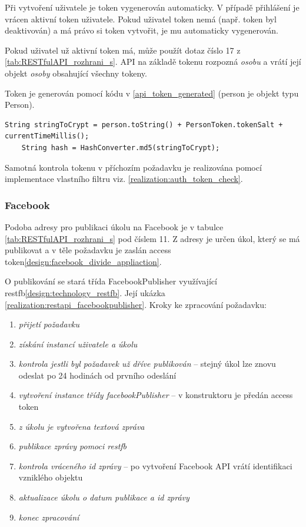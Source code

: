 \documentclass[thesis=B,czech]{FITthesis}[2012/06/26]
\begin{document}
Při vytvoření uživatele je token vygenerován automaticky. V případě přihlášení je vrácen aktivní token uživatele. Pokud uživatel token nemá (např. token byl deaktivován) a má právo si token vytvořit, je mu automaticky vygenerován.

Pokud uživatel už aktivní token má, může použít dotaz číslo 17 z \ref{tab:RESTfulAPI_rozhrani_s}. API na základě tokenu rozpozná \textit{osobu} a vrátí její objekt \textit{osoby} obsahující všechny tokeny. 

Token je generován pomocí kódu v \ref{api_token_generated} (person je objekt typu Person).

\begin{lstlisting}[label=api_token_generated,caption=Generování uživatelského tokenu]
	String stringToCrypt = person.toString() + PersonToken.tokenSalt + currentTimeMillis();
	String hash = HashConverter.md5(stringToCrypt);
\end{lstlisting}

Samotná kontrola tokenu v příchozím požadavku je realizována pomocí implementace vlastního filtru\cite{realization_spring_filter} viz. \ref{realization:auth_token_check}. 



\subsubsection{Facebook}
\label{realization:restapi_facebook}

Podoba adresy pro publikaci úkolu na Facebook je v tabulce \ref{tab:RESTfulAPI_rozhrani_s} pod číslem 11. Z adresy je určen úkol, který se má publikovat a v těle požadavku je zaslán access token\ref{design:facebook_divide_appliaction}. 

O publikování se stará třída FacebookPublisher využívající restfb\ref{design:technology_restfb}. Její ukázka \ref{realization:restapi_facebookpublisher}.
\vspace*{1\baselineskip}
\newline
Kroky ke zpracování požadavku:
\begin{enumerate}[nosep]
	\item \textit{přijetí požadavku}
	\item \textit{získání instancí uživatele a úkolu} 
	\item \textit{kontrola jestli byl požadavek už dříve publikován} -- stejný úkol lze znovu odeslat po 24 hodinách od prvního odeslání	
	\item \textit{vytvoření instance třídy facebookPublisher} -- v konstruktoru je předán access token
	\item \textit{z úkolu je vytvořena textová zpráva} 
	\item \textit{publikace zprávy pomoci restfb} 
	\item \textit{kontrola vráceného id zprávy} -- po vytvoření Facebook API vrátí identifikaci vzniklého objektu
	\item \textit{aktualizace úkolu o datum publikace a id zprávy}
	\item \textit{konec zpracování}
\end{enumerate}
\end{document}
